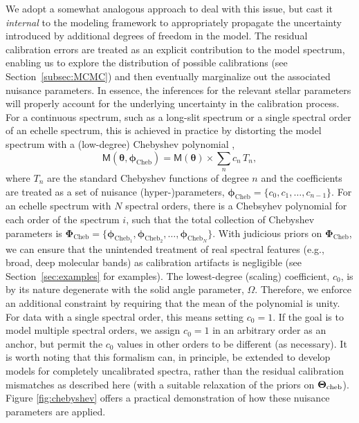 \documentclass[iop,floatfix]{emulateapj}
\newcommand{\vt}{ {\bm \theta}}
\newcommand{\vT}{ {\bm \Theta}}
\newcommand{\vM}{\mathsf{M}}
\newcommand{\vt}{ {\bm \theta}}
\newcommand{\vT}{ {\bm \Theta}}
\newcommand{\vp}{ {\bm \phi}}
\newcommand{\vP}{ {\bm \Phi}}
\newcommand{\stellarParameters}{\vt}
\newcommand{\cheb}{ \vp_{\textrm{Cheb}}}
\newcommand{\chebi}[1]{ \vp_{\textrm{Cheb}_{#1}}} %
\newcommand{\Cheb}{ \vP_{\textrm{Cheb}}}
\begin{document}
We adopt a somewhat analogous approach to deal with this issue, but cast it {\it internal} to the 
modeling framework to appropriately propagate the uncertainty introduced by additional degrees of 
freedom in the model.  The residual calibration errors are treated as an explicit contribution to 
the model spectrum, enabling us to explore the distribution of possible calibrations (see 
Section~\ref{subsec:MCMC}) and then eventually marginalize out the associated nuisance parameters.  
In essence, the inferences for the relevant stellar parameters will properly account for the 
underlying uncertainty in the calibration process.  For a continuous spectrum,
such as a long-slit spectrum or a single spectral order of an echelle spectrum,
this is achieved in practice by distorting the model spectrum with a
(low-degree) Chebyshev polynomial \citep[e.g.,][]{eisenstein06,koleva09}, 
\begin{equation}
\vM(\stellarParameters, \cheb) = \vM(\stellarParameters) \times \sum_n c_n \, T_n,
\label{eqn:chebyshev}
\end{equation}
where $T_n$ are the standard Chebyshev functions of degree $n$ and the coefficients are treated as a
set of nuisance (hyper-)parameters, $\cheb = \{c_0, c_1, \ldots, c_{n-1} \}$. For an echelle spectrum with $N$ spectral orders, there is a Chebsyhev polynomial for each order of the spectrum $i$, such that the total collection of Chebyshev parameters is $\Cheb = \{\chebi{1}, \chebi{2}, \ldots, \chebi{N} \}$.  With judicious priors on $\Cheb$, we can ensure that the 
unintended treatment of real spectral features (e.g., broad, deep molecular bands) as calibration 
artifacts is negligible (see Section~\ref{sec:examples} for examples).  The lowest-degree (scaling) 
coefficient, $c_0$, is by its nature degenerate with the solid angle parameter, $\Omega$.  
Therefore, we enforce an additional constraint by requiring that the mean of the polynomial is 
unity.  For data with a single spectral order, this means setting $c_0 = 1$.  If the goal is to 
model multiple spectral orders, we assign $c_0 = 1$ in an arbitrary order as an anchor, but permit 
the $c_0$ values in other orders to be different (as necessary).  It is worth noting that this 
formalism can, in principle, be extended to develop models for completely uncalibrated spectra, 
rather than the residual calibration mismatches as described here (with a suitable relaxation of 
the priors on $\vT_{\rm cheb}$).  Figure \ref{fig:chebyshev} offers a practical demonstration of 
how these nuisance parameters are applied. 
\end{document}
